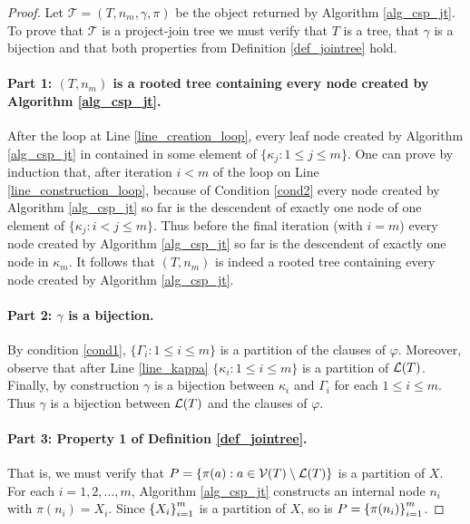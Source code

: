 \begin{proof}
Let $\mathcal{T} = (T, n_m, \gamma, \pi)$ be the object returned by Algorithm \ref{alg_csp_jt}. To prove that $\mathcal{T}$ is a project-join tree we must verify that $T$ is a tree, that $\gamma$ is a bijection and that both properties from Definition \ref{def_jointree} hold.

\paragraph{Part 1: $(T, n_m)$ is a rooted tree containing every node created by Algorithm \ref{alg_csp_jt}.}
After the loop at Line \ref{line_creation_loop}, every leaf node created by Algorithm \ref{alg_csp_jt} in contained in some element of $\{ \kappa_j : 1 \leq j \leq m\}$. One can prove by induction that, after iteration $i < m$ of the loop on Line \ref{line_construction_loop}, because of Condition \ref{cond2} every node created by Algorithm \ref{alg_csp_jt} so far is the descendent of exactly one node of one element of $\{ \kappa_j : i < j \leq m\}$. Thus before the final iteration (with $i = m$) every node created by Algorithm \ref{alg_csp_jt} so far is the descendent of exactly one node in $\kappa_m$. It follows that $(T, n_m)$ is indeed a rooted tree containing every node created by Algorithm \ref{alg_csp_jt}.

\paragraph{Part 2: $\gamma$ is a bijection.}
By condition \ref{cond1}, $\{ \Gamma_i : 1 \leq i \leq m\}$ is a partition of the clauses of $\varphi$. Moreover, observe that after Line \ref{line_kappa} $\{ \kappa_i : 1 \leq i \leq m\}$ is a partition of $\mathcal{L}(T)$. Finally, by construction $\gamma$ is a bijection between $\kappa_i$ and $\Gamma_i$ for each $1 \leq i \leq m$. Thus $\gamma$ is a bijection between $\mathcal{L}(T)$ and the clauses of $\varphi$.

\paragraph{Part 3: Property 1 of Definition \ref{def_jointree}.} 
That is, we must verify that $P = \{\pi(a) : a \in \mathcal{V}(T) \setminus \mathcal{L}(T) \}$ is a partition of $X$.
For each $i = 1, 2, \ldots, m$, Algorithm \ref{alg_csp_jt} constructs an internal node $n_i$ with $\pi(n_i) = X_i$.
Since $\left\{ X_i \right\}_{i = 1}^m$ is a partition of $X$, so is $P = \left\{ \pi(n_i) \right\}_{i = 1}^m$.


\end{proof}
